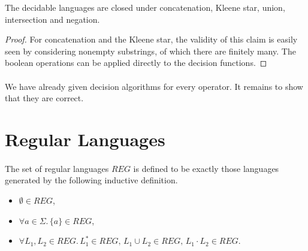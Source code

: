 \documentclass[11pt,a4paper,oneside]{book}
\begin{document}

                \vspace{-0.4cm}
                \vspace{-0.4cm}
                \vspace{-0.4cm}

            \begin{theorem}{}
                \label{DecLangClosed}
                The decidable languages are closed under concatenation, Kleene star, union, intersection and negation. 
            \end{theorem}
            \begin{proof}
                For concatenation and the Kleene star, the validity of this claim is easily seen by considering nonempty substrings, of which there are finitely many. 
                The boolean operations can be applied directly to the decision functions.
            \end{proof}

            \paragraph{}
                We have already given decision algorithms for every operator. 
                It remains to show that they are correct.
                 



                



        \section{Regular Languages}
        
    
            \paragraph{}
            The set of regular languages $REG$ is defined to be exactly those languages generated by the following inductive definition.
            \begin{itemize}
                \item
                    $\emptyset \in REG$, 
                \item
                    $\forall a \in \Sigma. \, \{a\} \in REG$, 
                \item
                    $\forall L_1, L_2 \in REG. \, L_1^* \in REG, \, L_1 \cup L_2 \in REG, \, L_1 \cdot L_2 \in REG$.
            \end{itemize}
\end{document}
